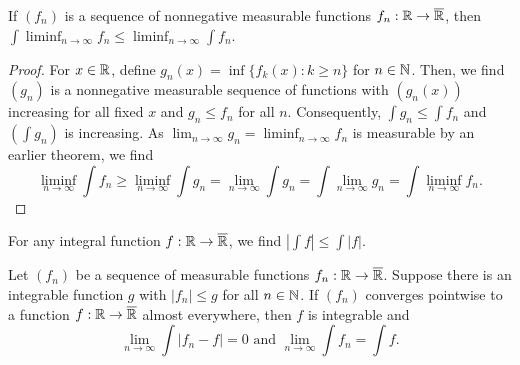 \begin{theorem}
	If \(\left( f_{n} \right) \) is a sequence of nonnegative measurable functions \(f_{n}:\mathbb{R}  \to\overline{\mathbb{R}} \), then \(\int \liminf_{n \to \infty} f_{n} \le \liminf_{n \to \infty} \int f_{n}\).
\end{theorem}
\begin{proof}
	For \(x \in \mathbb{R}\), define \(g_{n}\left( x \right)  = \inf \{ f_{k}\left( x \right)  :k \ge n  \} \) for \(n \in \mathbb{N}\). Then, we find \(\left( g_{n} \right) \) is a nonnegative measurable sequence of functions with \(\left( g_{n}\left( x \right)  \right) \) increasing for all fixed \(x\) and \(g_{n} \le f_{n}\) for all \(n\). Consequently, \(\int g_{n} \le \int f_{n}\)  and \(\left( \int g_{n} \right) \) is increasing. As \(\lim_{n \to \infty}g_{n} = \liminf_{n \to \infty} f_{n}\) is measurable by an earlier theorem, we find \[
	\liminf_{n \to \infty} \int f_{n} \ge \liminf_{n \to \infty} \int g_{n} = \lim_{n \to \infty} \int g_{n} = \int \lim_{n \to \infty}g_{n} = \int \liminf_{n \to \infty} f_{n}
	.\]
\end{proof}
\begin{proposition}
	For any integral function \(f: \mathbb{R} \to \overline{\mathbb{R}}\), we find \(\left| \int f \right| \le \int \left| f \right| \).
\end{proposition}
\begin{theorem}
	Let \(\left( f_{n} \right) \) be a sequence of measurable functions \(f_{n}: \mathbb{R} \to \overline{\mathbb{R}}\). Suppose there is an integrable function \(g\) with \(\left| f_{n} \right|\le g \) for all \(n \in \mathbb{N}\). If \(\left( f_{n} \right) \)  converges pointwise to a function \(f: \mathbb{R} \to \overline{\mathbb{R}}\) almost everywhere, then \(f\) is integrable and \[
	\lim_{n \to \infty}\int\left| f_{n} - f \right|  = 0 \text{ and } \lim_{n \to \infty}\int f_{n} = \int f
	.\]
\end{theorem}
